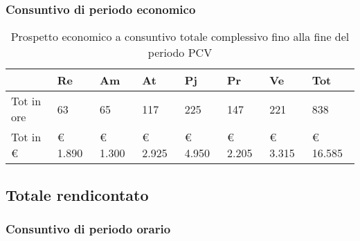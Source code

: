 		\subsubsection{Consuntivo di periodo economico}
						\begin{table}[H] \begin{center} \begin{tabular}{llllllll}
						\toprule
							&	\textbf{Re}	&	\textbf{Am}	&	\textbf{At}	&	\textbf{Pj}	&	\textbf{Pr}	&	\textbf{Ve}	&	\textbf{Tot}\\
						\midrule																					
						Tot in ore	&	63		&	65		&	117		&	225		&	147		&	221		&	838	\\
						Tot in €	&	 € 1.890 		 & 	 € 1.300 		 & 	 € 2.925 		 & 	 € 4.950 		 & 	 € 2.205 		 & 	 € 3.315 		 & 	 € 16.585 	\\
						\bottomrule			
						\end{tabular} \end{center} \caption{Prospetto economico a consuntivo totale complessivo fino alla fine del periodo PCV			
						}\label{tab:s_TotaleNonRendicontato} \end{table}
	
	\newpage
	\subsection{Totale rendicontato}
		\subsubsection{Consuntivo di periodo orario}
		

